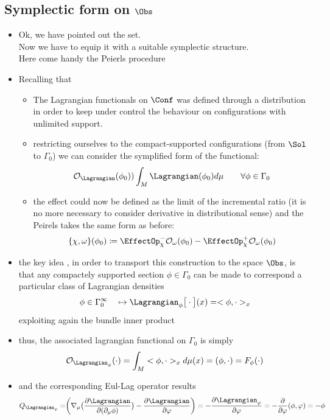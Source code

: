 \documentclass[a4paper,11pt]{scrartcl}
\begin{document}
	\subsection{Symplectic form on $\Obs$}
	\begin{itemize}
		\item Ok, we have pointed out the set.\\
		Now we have to equip it with a suitable symplectic structure.\\
		Here come handy the Peierls procedure
		\item Recalling that
		\begin{itemize}
			\item The Lagrangian functionals on $\Conf$ was defined through a distribution in order to keep under control the behaviour on configurations with unlimited support.
			\item restricting ourselves to the compact-supported configurations (from $\Sol$ to $\Gamma_0$) we can consider the symplified form of the functional:
			$$ \mathcal{O}_\Lagrangian ( \phi_0) ) \int_M \Lagrangian(\phi_0) d \mu \qquad \forall \phi \in \Gamma_0$$
			\item the effect could now be defined as the limit of the incremental ratio (it is no more necessary to consider derivative in distributional sense) and the Peirels takes the same form as before:
			$$\{\chi, \omega \}(\phi_0) \coloneqq \EffectOp_\chi^- \mathcal{O}_\omega (\phi_0) - \EffectOp_\chi^+ \mathcal{O}_\omega(\phi_0) $$
		\end{itemize}
		\item the key idea , in order to transport this construction to the space $\Obs$, is that any compactely supported section $\phi \in \Gamma_0$ can be made to correspond a particular class of Lagrangian densities
		$$ \phi \in \Gamma_0^\infty \quad \mapsto \Lagrangian_\phi \big[\cdot \big] ( x ) = <\phi, \cdot>_x $$
		exploiting again the bundle inner product
		\item thus, the associated lagrangian functional on $\Gamma_0$ is simply
		$$ 							\mathcal{O}_{\Lagrangian_\phi} (\cdot ) = \int_M  <\phi, \cdot>_x d\mu(x) = (\phi, \cdot) = F_\phi (\cdot)$$
		\item and the corresponding Eul-Lag operator results
		$$Q_{\Lagrangian_\phi}= \biggr( \nabla_\mu \big( \frac{\partial \Lagrangian}{\partial ( \partial_\mu \phi)} \big) - \frac{\partial \Lagrangian}{\partial \varphi} \biggr) = - \frac{\partial \Lagrangian_\varphi}{\partial \varphi} = -\frac{\partial}{\partial \varphi} (\phi, \varphi) = -\phi$$

\end{itemize}
\end{document}
